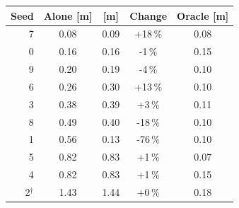 \begin{tabular}{rcccc}
\toprule
Seed & Alone [m] & \avatar{} [m] & Change & Oracle [m] \\
\midrule
7 & 0.08 & 0.09 & +18\,\% & 0.08 \\
0 & 0.16 & 0.16 & -1\,\% & 0.15 \\
9 & 0.20 & 0.19 & -4\,\% & 0.10 \\
6 & 0.26 & 0.30 & +13\,\% & 0.10 \\
3 & 0.38 & 0.39 & +3\,\% & 0.11 \\
8 & 0.49 & 0.40 & -18\,\% & 0.10 \\
1 & 0.56 & 0.13 & -76\,\% & 0.10 \\
5 & 0.82 & 0.83 & +1\,\% & 0.07 \\
4 & 0.82 & 0.83 & +1\,\% & 0.15 \\
2$^\dagger$ & 1.43 & 1.44 & +0\,\% & 0.18 \\
\bottomrule
\end{tabular}
